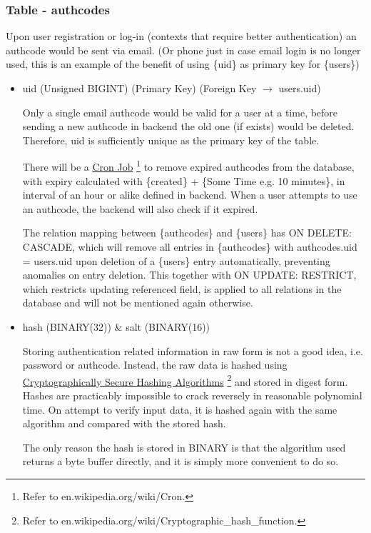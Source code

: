 \documentclass[12pt]{report}
\newcommand{\n}{\par}
\begin{document}
\subsubsection{Table - authcodes} \label{data-layer.design.user-system.authcodes}
Upon user registration or log-in (contexts that require better authentication) an authcode would be sent via email.
(Or phone just in case email login is no longer used, this is an example of the benefit of using \{uid\} as primary key for \{users\})
\begin{itemize}
	\item uid (Unsigned BIGINT) (Primary Key) (Foreign Key $\rightarrow$ users.uid)\n
	      Only a single email authcode would be valid for a user at a time,
	      before sending a new authcode in backend the old one (if exists) would be deleted.
	      Therefore, uid is sufficiently unique as the primary key of the table.\n
	      There will be a \href{https://en.wikipedia.org/wiki/Cron}{Cron Job}
	      \footnote{Refer to en.wikipedia.org/wiki/Cron.}
	      to remove expired authcodes from the database,
	      with expiry calculated with \{created\} + \{Some Time e.g. 10 minutes\},
	      in interval of an hour or alike defined in backend.
	      When a user attempts to use an authcode, the backend will also check if it expired.\n
	      The relation mapping between \{authcodes\} and \{users\} has ON DELETE: CASCADE,
	      which will remove all entries in \{authcodes\} with authcodes.uid = users.uid upon deletion of a \{users\} entry automatically,
	      preventing anomalies on entry deletion.
	      This together with ON UPDATE: RESTRICT, which restricts updating referenced field,
	      is applied to all relations in the database and will not be mentioned again otherwise.
	\item hash (BINARY(32)) \& salt (BINARY(16))\n
	      Storing authentication related information in raw form is not a good idea, i.e. password or authcode.
	      Instead, the raw data is hashed using
	      \href{https://en.wikipedia.org/wiki/Cryptographic_hash_function}{Cryptographically Secure Hashing Algorithms}
	      \footnote{Refer to en.wikipedia.org/wiki/Cryptographic\_hash\_function.}
	      and stored in digest form.
	      Hashes are practicably impossible to crack reversely in reasonable polynomial time.
	      On attempt to verify input data, it is hashed again with the same algorithm and compared with the stored hash.\n
	      The only reason the hash is stored in BINARY is that the algorithm used returns a byte buffer directly, and it is simply more convenient to do so.

\end{itemize}
\end{document}
